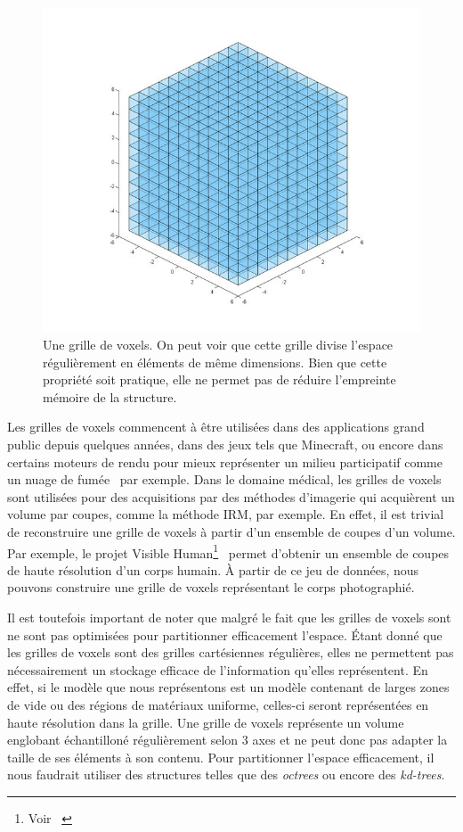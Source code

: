 {{{			\begin{figure}[h]
			    \centering
			    \includegraphics[width=.75\linewidth]{img/voxel_grid.jpg}
			    \captionsetup{width=.8\linewidth}
			    \caption{Une grille de voxels. On peut voir que cette grille divise l'espace régulièrement en éléments de même dimensions. Bien que cette propriété soit pratique, elle ne permet pas de réduire l'empreinte mémoire de la structure.}
			    \label{img:voxel_grid_example}
			\end{figure}

			Les grilles de voxels commencent à être utilisées dans des applications grand public depuis quelques années, dans des jeux tels que Minecraft, ou encore dans certains moteurs de rendu pour mieux représenter un milieu participatif comme un nuage de fumée~\cite{cite_voxel_smoke_rendering} par exemple. Dans le domaine médical, les grilles de voxels sont utilisées pour des acquisitions par des méthodes d'imagerie qui acquièrent un volume par coupes, comme la méthode IRM, par exemple. En effet, il est trivial de reconstruire une grille de voxels à partir d'un ensemble de coupes d'un volume. Par exemple, le projet Visible Human\footnote{Voir ~}~\cite{cite_visible_human} permet d'obtenir un ensemble de coupes de haute résolution d'un corps humain. À partir de ce jeu de données, nous pouvons construire une grille de voxels représentant le corps photographié.

			Il est toutefois important de noter que malgré le fait que les grilles de voxels sont ne sont pas optimisées pour partitionner efficacement l'espace. \'Etant donné que les grilles de voxels sont des grilles cartésiennes régulières, elles ne permettent pas nécessairement un stockage efficace de l'information qu'elles représentent. En effet, si le modèle que nous représentons est un modèle contenant de larges zones de vide ou des régions de matériaux uniforme, celles-ci seront représentées en haute résolution dans la grille. Une grille de voxels représente un volume englobant échantilloné régulièrement selon 3 axes et ne peut donc pas adapter la taille de ses éléments à son contenu. Pour partitionner l'espace efficacement, il nous faudrait utiliser des structures telles que des \textit{octrees} ou encore des \textit{kd-trees}. 

}}}
